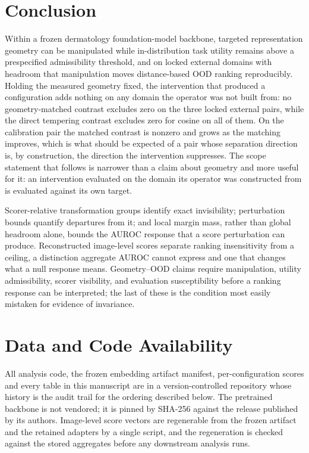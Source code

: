 \documentclass[11pt,a4paper]{article}
\begin{document}
\section{Conclusion}
Within a frozen dermatology foundation-model backbone, targeted representation geometry can be manipulated while in-distribution task utility remains above a prespecified admissibility threshold, and on locked external domains with headroom that manipulation moves distance-based OOD ranking reproducibly. Holding the measured geometry fixed, the intervention that produced a configuration adds nothing on any domain the operator was not built from: no geometry-matched contrast excludes zero on the three locked external pairs, while the direct tempering contrast excludes zero for cosine on all of them. On the calibration pair the matched contrast is nonzero and grows as the matching improves, which is what should be expected of a pair whose separation direction is, by construction, the direction the intervention suppresses. The scope statement that follows is narrower than a claim about geometry and more useful for it: an intervention evaluated on the domain its operator was constructed from is evaluated against its own target.

Scorer-relative transformation groups identify exact invisibility; perturbation bounds quantify departures from it; and local margin mass, rather than global headroom alone, bounds the AUROC response that a score perturbation can produce. Reconstructed image-level scores separate ranking insensitivity from a ceiling, a distinction aggregate AUROC cannot express and one that changes what a null response means. Geometry--OOD claims require manipulation, utility admissibility, scorer visibility, and evaluation susceptibility before a ranking response can be interpreted; the last of these is the condition most easily mistaken for evidence of invariance.

\section*{Data and Code Availability}
All analysis code, the frozen embedding artifact manifest, per-configuration
scores and every table in this manuscript are in a version-controlled
repository whose history is the audit trail for the ordering described below.
The pretrained backbone is not vendored; it is pinned by SHA-256 against the
release published by its authors. Image-level score vectors are regenerable
from the frozen artifact and the retained adapters by a single script, and the
regeneration is checked against the stored aggregates before any downstream
analysis runs.
\end{document}
